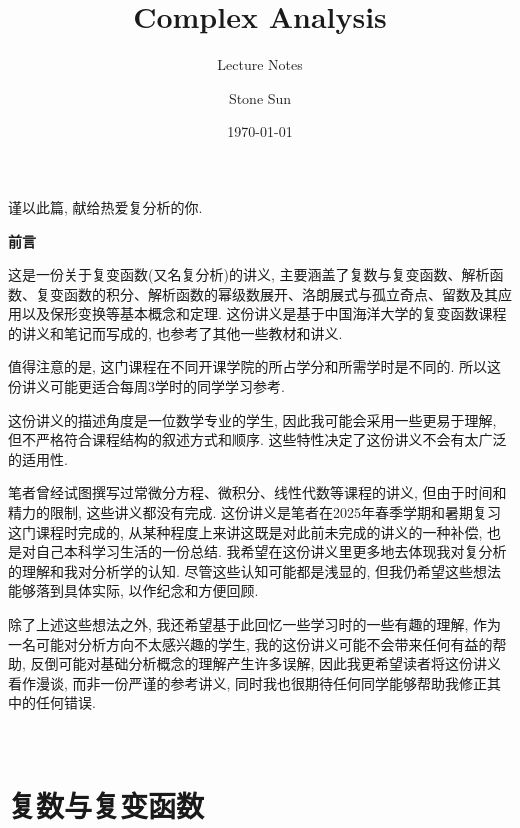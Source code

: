 \documentclass[theorem=false,mathfont=none,openany,sub3section]{easybook}
\title{Complex Analysis}
\subtitle{Lecture Notes}
\author{Stone Sun}
\date{\today}
\renewcommand{\rmdefault}{lmr}
\begin{document}
\maketitle
\begin{center}
谨以此篇, 献给热爱复分析的你.\par
\end{center}
\frontmatter

\begingroup
\renewcommand{\familydefault}{\rmdefault}
\tableofcontents
\endgroup

\newpage
\begin{center}
\Large
\textbf{前言}\par
\end{center}

\hspace{2em}

这是一份关于复变函数(又名复分析)的讲义, 主要涵盖了复数与复变函数、解析函数、复变函数的积分、解析函数的幂级数展开、洛朗展式与孤立奇点、留数及其应用以及保形变换等基本概念和定理. 这份讲义是基于中国海洋大学的复变函数课程的讲义和笔记而写成的, 也参考了其他一些教材和讲义.\par
值得注意的是, 这门课程在不同开课学院的所占学分和所需学时是不同的. 所以这份讲义可能更适合每周3学时的同学学习参考.\par
这份讲义的描述角度是一位数学专业的学生, 因此我可能会采用一些更易于理解, 但不严格符合课程结构的叙述方式和顺序. 这些特性决定了这份讲义不会有太广泛的适用性.\par
笔者曾经试图撰写过常微分方程、微积分、线性代数等课程的讲义, 但由于时间和精力的限制, 这些讲义都没有完成. 这份讲义是笔者在2025年春季学期和暑期复习这门课程时完成的, 从某种程度上来讲这既是对此前未完成的讲义的一种补偿, 也是对自己本科学习生活的一份总结. 我希望在这份讲义里更多地去体现我对复分析的理解和我对分析学的认知. 尽管这些认知可能都是浅显的, 但我仍希望这些想法能够落到具体实际, 以作纪念和方便回顾.\par
除了上述这些想法之外, 我还希望基于此回忆一些学习时的一些有趣的理解, 作为一名可能对分析方向不太感兴趣的学生, 我的这份讲义可能不会带来任何有益的帮助, 反倒可能对基础分析概念的理解产生许多误解, 因此我更希望读者将这份讲义看作漫谈, 而非一份严谨的参考讲义, 同时我也很期待任何同学能够帮助我修正其中的任何错误.\par
\begin{flushright}
\\
\text{\today}
\end{flushright}

\mainmatter

\chapter{复数与复变函数}
\end{document}
